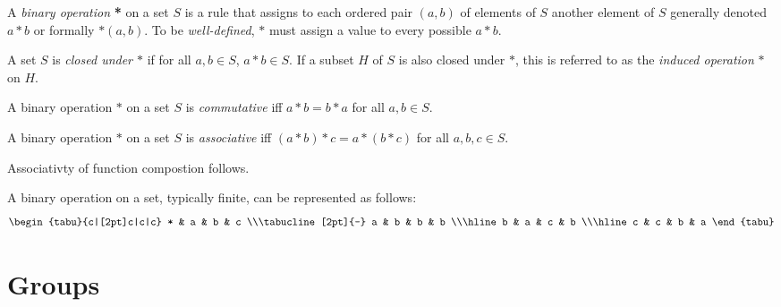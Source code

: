 \begin{definition}
    A \textit{binary operation} \textbf{*} on a set $S$ is a rule that assigns to each ordered pair $(a,b)$ of elements of $S$ another element of $S$ generally denoted $a*b$ or formally $*(a,b)$. To be \emph{well-defined}, $*$ must assign a value to every possible $a*b$.
\end{definition}
\begin{definition}
    A set $S$ is \emph{closed under $*$} if for all $a,b \in S$, $a*b \in S$. If a subset $H$ of $S$ is also closed under $*$, this is referred to as the \emph{induced operation} $*$ on $H$.
\end{definition}
\begin{definition}
    A binary operation $*$ on a set $S$ is \textit{commutative} iff $a*b = b*a$ for all $a,b \in S$.
\end{definition}
\begin{definition}
    A binary operation $*$ on a set $S$ is \textit{associative} iff $(a*b)*c = a*(b*c)$ for all $a,b,c \in S$.
\end{definition}
\begin{note}
    Associativty of function compostion follows.
\end{note}
\begin{remark}
    A binary operation on a set, typically finite, can be represented as follows:
    \[ 
        \renewcommand\arraystretch{1.2}
        \begin{tabu}{c|[2pt]c|c|c}
            * & a & b & c \\\tabucline[2pt]{-}
            a & b & b & b \\\hline
            b & a & c & b \\\hline
            c & c & b & a
        \end{tabu}
    \]
\end{remark}

\section{Groups}

